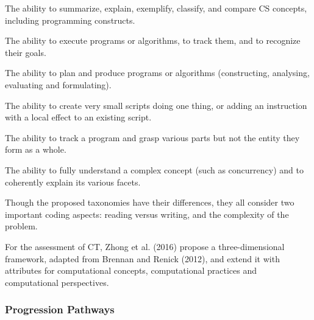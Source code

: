 \begin{description}[leftmargin=1em]
\item[Understanding:] The ability to summarize, explain, exemplify,
    classify, and compare CS concepts, including programming constructs.
\item[Applying:] The ability to execute programs or algorithms, to track
    them, and to recognize their goals.
\item[Creating:] The ability to plan and produce programs or algorithms
    (constructing, analysing, evaluating and formulating).
\item[Unistructural:] The ability to create very small scripts doing one
    thing, or adding an instruction with a local effect to an existing
    script.
\item[Multistructural:] The ability to track a program and grasp various
    parts but not the entity they form as a whole.
\item[Relational:] The ability to fully understand a complex concept (such
    as concurrency) and to coherently explain its various facets.
\end{description}



Though the proposed taxonomies have their differences, they all consider two important coding aspects: reading versus writing, and the complexity of the problem.

For the assessment of CT, Zhong et al. (2016) propose a three-dimensional framework, adapted from Brennan and Renick (2012), and extend it with attributes for computational concepts, computational practices and computational perspectives.


\subsubsection*{Progression Pathways}



